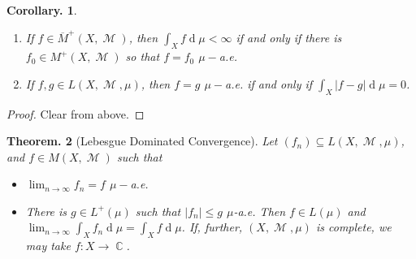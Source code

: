 \documentclass[11pt, a4paper]{memoir}
\DeclareMathOperator{\C}{{\mathbb{C}}}
\newcommand{\ol}[1]{\ensuremath{\overline{#1}}}
\theoremstyle{change}
\newtheorem{theorem}{Theorem.}[section]
\newtheorem{corollary}[theorem]{Corollary.}
\theoremstyle{plain}
\theoremstyle{nonumberplain}
\newtheorem{proof}{Proof}
\DeclareMathOperator{\M}{{\mathcal{M}}}
\renewcommand{\d}[1]{\ensuremath{\operatorname{d}\!{#1}}}
\numberwithin{equation}{section}
\begin{document}
\begin{corollary}
    \begin{enumerate}
        \item If $f\in\ol{M}^+(X,\M)$, then $\int_Xf\d{\mu}<\infty$ if and only if there is $f_0\in M^+(X,\M)$ so that $f=f_0$ $\mu-$a.e.
        \item If $f,g\in L(X,\M,\mu)$, then $f=g$ $\mu-$a.e. if and only if $\int_X|f-g|\d{\mu}=0$.
    \end{enumerate}
\end{corollary}
\begin{proof}
    Clear from above.
\end{proof}
\begin{theorem}[Lebesgue Dominated Convergence]
    Let $(f_n)\subseteq L(X,\M,\mu)$, and $f\in M(X,\M)$ such that
    \begin{itemize}[nolistsep]
        \item $\lim_{n\to\infty} f_n=f$ $\mu-$a.e.
        \item There is $g\in L^+(\mu)$ such that $|f_n|\leq g$ $\mu$-a.e.
            Then $f\in L(\mu)$ and $\lim_{n\to\infty}\int_X f_n\d{\mu}=\int_X f\d{\mu}$.
            If, further, $(X,\M,\mu)$ is complete, we may take $f:X\to\C$.
    \end{itemize}
\end{theorem}
\end{document}
